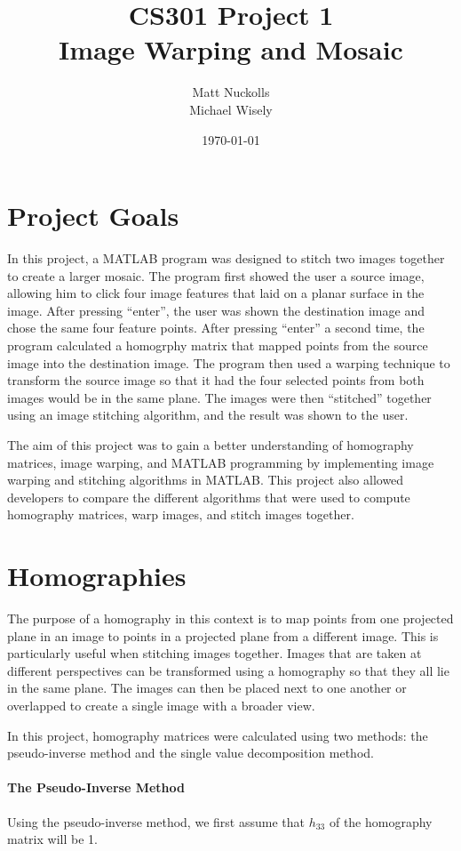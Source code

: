 \documentclass[11pt, letterpaper]{article}
\title{CS301 Project 1\\Image Warping and Mosaic}
\author{ Matt  Nuckolls \\ 
         Michael Wisely \\ }
\date{\today}
\begin{document}
\maketitle

\section{Project Goals}
In this project, a MATLAB program was designed to stitch two images
together to create a larger mosaic. The program first showed the user
a source image, allowing him to click four image features that laid on
a planar surface in the image. After pressing ``enter'', the user was
shown the destination image and chose the same four feature
points. After pressing ``enter'' a second time, the program calculated
a homogrphy matrix that mapped points from the source image into the
destination image. The program then used a warping technique to
transform the source image so that it had the four selected points
from both images would be in the same plane. The images were then
``stitched'' together using an image stitching algorithm, and the
result was shown to the user.

The aim of this project was to gain a better understanding of
homography matrices, image warping, and MATLAB programming by
implementing image warping and stitching algorithms in MATLAB. This
project also allowed developers to compare the different algorithms
that were used to compute homography matrices, warp images, and stitch
images together.

\section{Homographies}
The purpose of a homography in this context is to map points from one
projected plane in an image to points in a projected plane from a
different image. This is particularly useful when stitching images
together. Images that are taken at different perspectives can be
transformed using a homography so that they all lie in the same
plane. The images can then be placed next to one another or overlapped
to create a single image with a broader view. 

In this project, homography matrices were calculated using two methods:
the pseudo-inverse method and the single value decomposition method.

\paragraph{The Pseudo-Inverse Method}
Using the pseudo-inverse method, we first assume that $h_{33}$ of the
homography matrix will be 1. 
\end{document}
